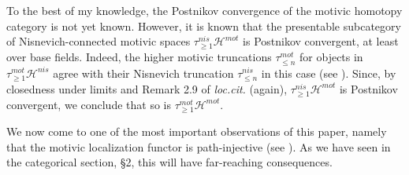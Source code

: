\begin{rem}
 To the best of my knowledge, the Postnikov convergence of the motivic homotopy category is not yet known. However, it is known that the presentable subcategory of Nisnevich-connected motivic spaces $\tau^{nis}_{\geq 1}\mathcal{H}^{mot}$ is Postnikov convergent, at least over base fields. Indeed, the higher motivic truncations $\tau^{mot}_{\leq n}$ for objects in $\tau^{mot}_{\geq 1}\mathcal{H}^{nis}$ agree with their Nisnevich truncation $\tau_{\leq n}^{nis}$ in this case (see ). Since, by closedness under limits and Remark 2.9 of \textit{loc.cit.} (again), $\tau^{nis}_{\geq 1}\mathcal{H}^{mot}$ is Postnikov convergent, we conclude that so is $\tau^{mot}_{\geq 1}\mathcal{H}^{mot}$.
\end{rem}
We now come to one of the most important observations of this paper, namely that the motivic localization functor is path-injective (see ). As we have seen in the categorical section, \S2, this will have far-reaching consequences.

